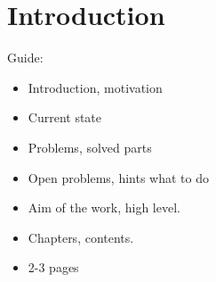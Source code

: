 \documentclass[
  digital, %
  twoside, %
  table,   %
  lof,     %
  lot,     %
]{fithesis3}
\theoremstyle{definition}
\theoremstyle{remark}
\begin{document}
\setlength{\marginparwidth}{2.5cm}   %
\setcounter{biburlnumpenalty}{5000}  %


\chapter{Introduction}
\begin{shaded}
Guide:
\begin{itemize}
    \item Introduction, motivation
    \item Current state
    \item Problems, solved parts
    \item Open problems, hints what to do
    \item Aim of the work, high level.
    \item Chapters, contents.
    \item 2-3 pages %
\end{itemize}
\end{shaded}
\end{document}
